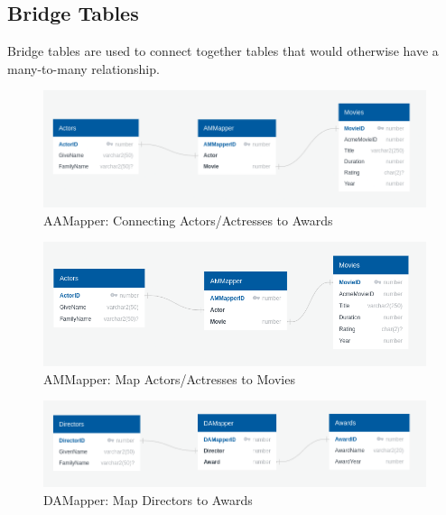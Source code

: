 \documentclass[letterpaper,12pt]{article}
\begin{document}
\subsection{Bridge Tables}
Bridge tables are used to connect together tables that would otherwise have a many-to-many relationship.
\begin{figure}[H]
	\centering
	\caption{AAMapper: Connecting Actors/Actresses to Awards}
	\label{fig:AAMapper}
	\includegraphics[width=1.0\linewidth]{AAMapper - Actors - Awards.png}
\end{figure}
\begin{figure}[H]
	\centering
	\caption{AMMapper: Map Actors/Actresses to Movies}
	\label{fig:AMMapper}
	\includegraphics[width=1.0\linewidth]{"AMMapper - Actors - Movies.png"}
\end{figure}
\begin{figure}[H]
	\centering
	\caption{DAMapper: Map Directors to Awards}
	\label{fig:DAMapper}
	\includegraphics[width=1.0\linewidth]{"DAMapper - Directors - Awards.png"}
\end{figure}
\end{document}
